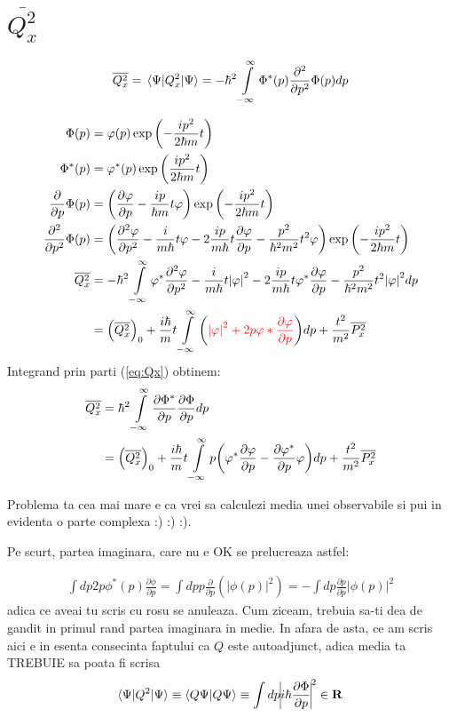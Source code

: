 \documentclass[11pt]{article} %
\newcommand*{\mathcolor}{}
\def\mathcolor#1#{\mathcoloraux{#1}}
\newcommand*{\mathcoloraux}[3]{%
  \protect\leavevmode
  \begingroup
    \color#1{#2}#3%
  \endgroup
}
\newcommand*\mean[1]{\overline{#1}}
\newcommand{\integral}{\int\limits_{-\infty}^{\infty}}
\begin{document}
\section{\(\mean{Q_x^2}\)}
\label{sec:Qx2}

\begin{equation}
\label{eq:Qx}
  \mean{Q_x^2} = \expval{Q_x^2}{\Psi} = -\hbar^2 \integral \Phi^*(p) \pdv[2]{p} \Phi(p) dp
\end{equation}

\begin{align*}
  \Phi(p) &= \varphi(p) \exp\qty(- \frac{i p^2}{2\hbar m} t) \\
  \Phi^*(p) &= \varphi^*(p) \exp\qty(\frac{i p^2}{2\hbar m} t) \\
  \pdv{p} \Phi(p) &= \qty(\pdv{\varphi}{p} - \frac{i p}{\hbar m} t \varphi)
    \exp\qty(- \frac{i p^2}{2\hbar m} t) \\
  \pdv[2]{p} \Phi(p) &= \qty(\pdv[2]{\varphi}{p} - \frac{i}{m \hbar} t \varphi
    - 2\frac{i p}{m \hbar} t \pdv{\varphi}{p} - \frac{p^2}{\hbar^2 m^2} t^2 \varphi)
    \exp\qty(- \frac{i p^2}{2\hbar m} t) \\
  \mean{Q_x^2} &= -\hbar^2 \integral \varphi^* \pdv[2]{\varphi}{p}
    - \frac{i}{m \hbar} t \abs{\varphi}^2 - 2\frac{i p}{m \hbar} t \varphi^* \pdv{\varphi}{p}
    - \frac{p^2}{\hbar^2 m^2} t^2 \abs{\varphi}^2 dp \\ &=
  \qty(\mean{Q_x^2})_0
    + \frac{i \hbar}{m} t \integral \qty(\mathcolor{red}{\abs{\varphi}^2 + 2p\varphi* \pdv{\varphi}{p}}) dp
    + \frac{t^2}{m^2} \mean{P_x^2} \\
\end{align*}
Integrand prin parti (\ref{eq:Qx}) obtinem:
\begin{align*}
  \mean{Q_x^2} &= \hbar^2 \integral \pdv{\Phi^*}{p} \pdv{\Phi}{p} dp \\ &=
    \qty(\mean{Q_x^2})_0
    + \frac{i \hbar}{m} t \integral p \qty(\varphi^* \pdv{\varphi}{p} - \pdv{\varphi^*}{p}\varphi)dp
    + \frac{t^2}{m^2} \mean{P_x^2} \\
\end{align*}



{\color{PineGreen} Problema ta cea mai mare e ca vrei sa calculezi media unei observabile si pui in evidenta o parte complexa :) :) :).

Pe scurt, partea imaginara, care nu e OK se prelucreaza astfel:

\begin{align}
\int dp 2p\phi^*(p)\frac{\partial\phi}{\partial p}=\int dp p \frac{\partial}{\partial p}\left(|\phi(p)|^2\right)=-\int dp \frac{\partial p}{\partial p}|\phi(p)|^2
\end{align}
adica ce aveai tu scris cu rosu se anuleaza. Cum ziceam, trebuia sa-ti dea de gandit in primul rand partea imaginara in medie.
In afara de asta, ce am scris aici e in esenta consecinta faptului ca $Q$ este autoadjunct, adica media ta TREBUIE sa poata fi scrisa
\begin{align}
\langle \Psi|Q^2|\Psi\rangle\equiv\langle Q\Psi|Q\Psi\rangle\equiv\int dp {\vline i\hbar\frac{\partial\Phi}{\partial p}\vline}^2\in {\bf R}
\end{align}
}
\end{document}
